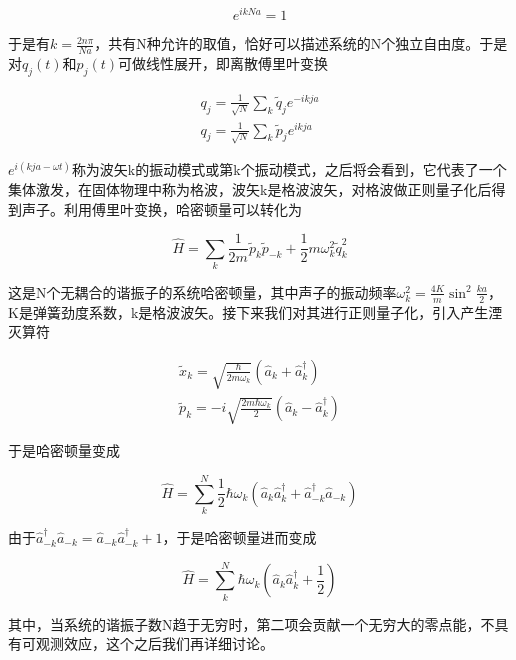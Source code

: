 \begin{equation}
    e^{ikNa}=1
\end{equation}

于是有$k=\frac{2n\pi}{Na}$，共有N种允许的取值，恰好可以描述系统的N个独立自由度。于是对$q_j(t)$和$p_j(t)$可做线性展开，即离散傅里叶变换

\begin{equation}
	\begin{array}{lr}
		q_j=\frac{1}{\sqrt{N}}\sum_{k}\tilde{q}_je^{-ikja} \\
		q_j=\frac{1}{\sqrt{N}}\sum_{k}\tilde{p}_je^{ikja}
	\end{array}
\end{equation}

$e^{i(kja-\omega t)}$称为波矢k的振动模式或第k个振动模式，之后将会看到，它代表了一个集体激发，在固体物理中称为格波，波矢k是格波波矢，对格波做正则量子化后得到声子。利用傅里叶变换，哈密顿量可以转化为

\begin{equation}
	\hat{H}=\sum_{k}\frac{1}{2m}\tilde{p}_k\tilde{p}_{-k}+\frac{1}{2}m\omega_k^2\tilde{q}_k^2
\end{equation}

这是N个无耦合的谐振子的系统哈密顿量，其中声子的振动频率$\omega_k^2=\frac{4K}{m}\sin^2\frac{ka}{2}$，K是弹簧劲度系数，k是格波波矢。接下来我们对其进行正则量子化，引入产生湮灭算符

\begin{equation}
	\begin{array}{lr}
		\tilde{x}_k=\sqrt{\frac{\hbar}{2m\omega_k}}(\hat{a}_k+\hat{a}_k^\dagger) \\
		\tilde{p}_k=-i\sqrt{\frac{2m\hbar\omega_k}{2}}(\hat{a}_k-\hat{a}_k^\dagger)
	\end{array}
\end{equation}

于是哈密顿量变成

\begin{equation}
	\hat{H}=\sum_{k}^N\frac{1}{2}\hbar\omega_k(\hat{a}_k\hat{a}_k^\dagger+\hat{a}_{-k}^\dagger\hat{a}_{-k})
\end{equation}

由于$\hat{a}_{-k}^\dagger\hat{a}_{-k}=\hat{a}_{-k}\hat{a}_{-k}^\dagger+1$，于是哈密顿量进而变成

\begin{equation}
	\hat{H}=\sum_{k}^N\hbar\omega_k(\hat{a}_k\hat{a}_k^\dagger+\frac{1}{2})
\end{equation}

其中，当系统的谐振子数N趋于无穷时，第二项会贡献一个无穷大的零点能，不具有可观测效应，这个之后我们再详细讨论。





